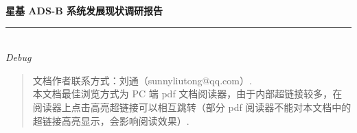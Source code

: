 
\thispagestyle{empty}

\noindent\begin{minipage}{\textwidth}
\raggedleft
{\huge \bfseries 星基 ADS-B 系统发展现状调研报告}
\noindent\rule[-1ex]{\textwidth}{5pt}\\[2.5ex]
\hfill\emph{\Large Debug\footnotemark}
\end{minipage}

\noindent{}


\begin{quote}\footnotesize
  文档作者联系方式：刘通（sunnyliutong@qq.com）. \\
  本文档最佳浏览方式为 PC 端 pdf 文档阅读器，由于内部超链接较多，在阅读器上点击高亮超链接可以相互跳转（部分 pdf 阅读器不能对本文档中的超链接高亮显示，会影响阅读效果）.
\end{quote}